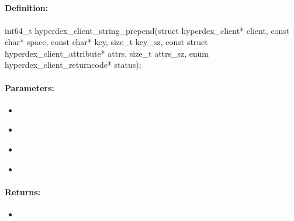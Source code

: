 \pagebreak
\subsection{}
\label{api:c:string_prepend}


\paragraph{Definition:}
\begin{ccode}
int64_t hyperdex_client_string_prepend(struct hyperdex_client* client,
        const char* space,
        const char* key, size_t key_sz,
        const struct hyperdex_client_attribute* attrs, size_t attrs_sz,
        enum hyperdex_client_returncode* status);
\end{ccode}

\paragraph{Parameters:}
\begin{itemize}[noitemsep]
\item {}\\

\item {}\\

\item {}\\

\item {}\\

\end{itemize}

\paragraph{Returns:}
\begin{itemize}[noitemsep]
\item {}\\

\end{itemize}

